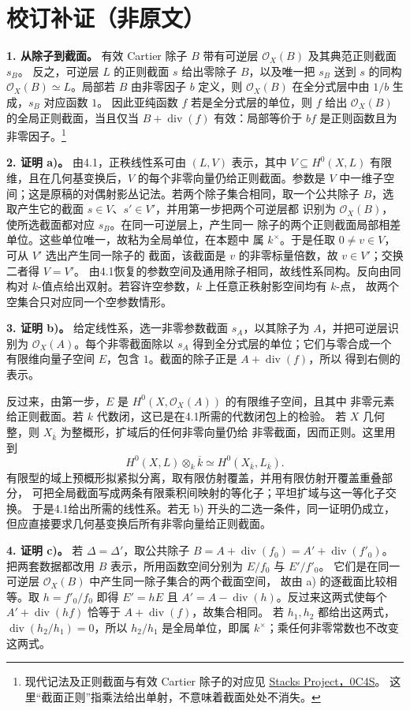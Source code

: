 \documentclass[openany,fontset=fandol]{ctexbook}
\DeclareMathOperator{\Div}{div}
\newcommand{\OO}{\mathcal O}
\begin{document}
\clearpage
\section*{校订补证（非原文）}
\noindent\textbf{1. 从除子到截面。}
有效 Cartier 除子 \(B\) 带有可逆层 \(\OO_X(B)\) 及其典范正则截面 \(s_B\)。
反之，可逆层 \(L\) 的正则截面 \(s\) 给出零除子 \(B\)，以及唯一把 \(s_B\)
送到 \(s\) 的同构 \(\OO_X(B)\simeq L\)。局部若 \(B\) 由非零因子 \(b\)
定义，则 \(\OO_X(B)\) 在全分式层中由 \(1/b\) 生成，\(s_B\) 对应函数 \(1\)。
因此亚纯函数 \(f\) 若是全分式层的单位，则 \(f\) 给出 \(\OO_X(B)\)
的全局正则截面，当且仅当 \(B+\Div(f)\) 有效：局部等价于 \(bf\)
是正则函数且为非零因子。\footnote{现代记法及正则截面与有效 Cartier 除子的对应见
\href{https://stacks.math.columbia.edu/tag/0C4S}{Stacks Project，0C4S}。
这里“截面正则”指乘法给出单射，不意味着截面处处不消失。}

\medskip\noindent\textbf{2. 证明 a)。}
由4.1，正秩线性系可由 \((L,V)\) 表示，其中 \(V\subseteq H^0(X,L)\)
有限维，且在几何基变换后，\(V\) 的每个非零向量仍给正则截面。参数是 \(V\)
中一维子空间；这是原稿的对偶射影丛记法。若两个除子集合相同，取一个公共除子
\(B\)，选取产生它的截面 \(s\in V\)、\(s'\in V'\)，并用第一步把两个可逆层都
识别为 \(\OO_X(B)\)，使所选截面都对应 \(s_B\)。在同一可逆层上，产生同一
除子的两个正则截面局部相差单位。这些单位唯一，故粘为全局单位，在本题中
属 \(k^\times\)。于是任取 \(0\ne v\in V\)，可从 \(V'\) 选出产生同一除子的
截面，该截面是 \(v\) 的非零标量倍数，故 \(v\in V'\)；交换二者得 \(V=V'\)。
由4.1恢复的参数空间及通用除子相同，故线性系同构。反向由同构对
\(k\)-值点给出双射。若容许空参数，\(k\) 上任意正秩射影空间均有 \(k\)-点，
故两个空集合只对应同一个空参数情形。

\medskip\noindent\textbf{3. 证明 b)。}
给定线性系，选一非零参数截面 \(s_A\)，以其除子为 \(A\)，并把可逆层识别为
\(\OO_X(A)\)。每个非零截面除以 \(s_A\) 得到全分式层的单位；它们与零合成一个
有限维向量子空间 \(E\)，包含 \(1\)。截面的除子正是 \(A+\Div(f)\)，所以
得到右侧的表示。

反过来，由第一步，\(E\) 是 \(H^0(X,\OO_X(A))\) 的有限维子空间，且其中
非零元素给正则截面。若 \(k\) 代数闭，这已是在4.1所需的代数闭包上的检验。
若 \(X\) 几何整，则 \(X_{\overline k}\) 为整概形，扩域后的任何非零向量仍给
非零截面，因而正则。这里用到
\[
 H^0(X,L)\otimes_k\overline k\simeq H^0(X_{\overline k},L_{\overline k}).
\]
有限型的域上预概形拟紧拟分离，取有限仿射覆盖，并用有限仿射开覆盖重叠部分，
可把全局截面写成两条有限乘积间映射的等化子；平坦扩域与这一等化子交换。
于是4.1给出所需的线性系。若无 b) 开头的二选一条件，同一证明仍成立，
但应直接要求几何基变换后所有非零向量给正则截面。

\medskip\noindent\textbf{4. 证明 c)。}
若 \(\Delta=\Delta'\)，取公共除子 \(B=A+\Div(f_0)=A'+\Div(f'_0)\)。
把两套数据都改用 \(B\) 表示，所用函数空间分别为 \(E/f_0\) 与 \(E'/f'_0\)。
它们是在同一可逆层 \(\OO_X(B)\) 中产生同一除子集合的两个截面空间，
故由 a) 的逐截面比较相等。取 \(h=f'_0/f_0\) 即得
\(E'=hE\) 且 \(A'=A-\Div(h)\)。反过来这两式使每个
\(A'+\Div(hf)\) 恰等于 \(A+\Div(f)\)，故集合相同。
若 \(h_1,h_2\) 都给出这两式，\(\Div(h_2/h_1)=0\)，所以
\(h_2/h_1\) 是全局单位，即属 \(k^\times\)；乘任何非零常数也不改变这两式。
\end{document}
